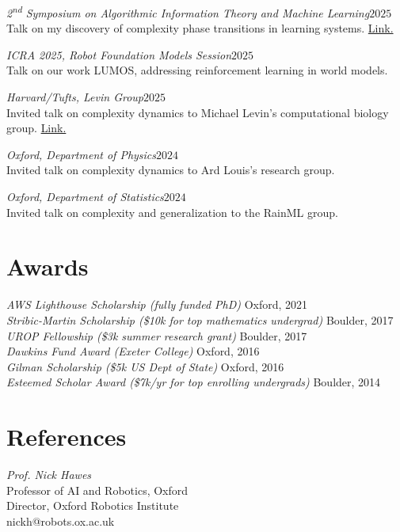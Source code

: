 \documentclass[margin]{res}
\begin{document}
\begin{resume}
                {\sl 2\textsuperscript{nd} Symposium on Algorithmic Information Theory and Machine Learning\hfill $2025$}\\
                Talk on my discovery of complexity phase transitions in learning systems.
                \href{https://www.youtube.com/watch?v=6QjSH9ghUJs}{Link.}

                {\sl ICRA 2025, Robot Foundation Models Session\hfill $2025$}\\
                Talk on our work LUMOS, addressing reinforcement learning in world models.

                {\sl Harvard/Tufts, Levin Group\hfill $2025$}\\
                Invited talk on complexity dynamics to Michael Levin's computational biology group.
                \href{https://www.youtube.com/watch?v=gb0z8lV1i78}{Link.}

                {\sl Oxford, Department of Physics\hfill $2024$}\\
                Invited talk on complexity dynamics to Ard Louis's research group.

                {\sl Oxford, Department of Statistics\hfill $2024$}\\
                Invited talk on complexity and generalization to the RainML group.


                \section{Awards}

                {\sl AWS Lighthouse Scholarship (fully funded PhD)} \hfill Oxford, 2021 \\
                {\sl Stribic-Martin Scholarship (\$10k for top mathematics undergrad)} \hfill Boulder, 2017 \\
                {\sl UROP Fellowship (\$3k summer research grant)} \hfill Boulder, 2017 \\
                {\sl Dawkins Fund Award (Exeter College)} \hfill Oxford, 2016 \\
                {\sl Gilman Scholarship (\$5k US Dept of State)} \hfill Oxford, 2016 \\
                {\sl Esteemed Scholar Award (\$7k/yr for top enrolling undergrads)} \hfill Boulder, 2014 \\


                \section{References}
                        {\sl Prof. Nick Hawes}\\
                        Professor of AI and Robotics, Oxford\\
                        Director, Oxford Robotics Institute\\
                        nickh@robots.ox.ac.uk


\end{resume}
\end{document}
